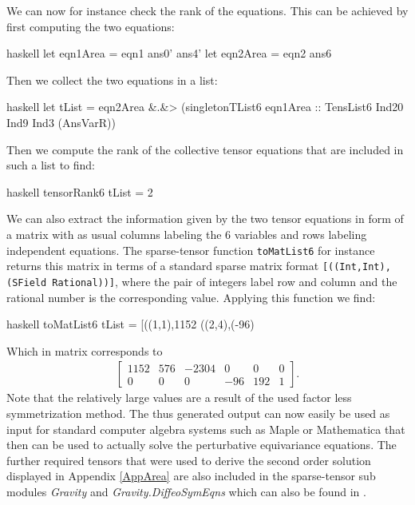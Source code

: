 \documentclass[a4paper,12pt, DIV=14, BCOR=5mm, twoside, headsepline, numbers=noenddot]{scrbook}
\begin{document}
We can now for instance check the rank of the equations. This can be achieved by first computing the two equations:

\begin{center}
\begin{cminted}{haskell}
let eqn1Area = eqn1 ans0' ans4' 
let eqn2Area = eqn2 ans6  
\end{cminted}
\end{center}
Then we collect the two equations in a list:
\begin{center}
\begin{cminted}{haskell}
let tList = eqn2Area &.&> (singletonTList6 eqn1Area ::
            TensList6 Ind20 Ind9 Ind3 (AnsVarR)) 
\end{cminted}
\end{center}
Then we compute the rank of the collective tensor equations that are included in such a list to find:
\begin{center}
\begin{cminted}{haskell}
tensorRank6 tList = 2 
\end{cminted}
\end{center}
We can also extract the information given by the two tensor equations in form of a matrix with as usual columns labeling the 6 variables and rows labeling independent equations. The sparse-tensor function \texttt{toMatList6} for instance returns this matrix in terms of a standard sparse matrix format \texttt{[((Int,Int),(SField Rational))]}, where the pair of integers label row and column and the rational number is the corresponding value. Applying this function we find:
\begin{center}
\begin{cminted}{haskell}
toMatList6 tList = [((1,1),1152 %
                   ((2,4),(-96) %
\end{cminted}
\end{center}
Which in matrix corresponds to 
\begin{align}
    \begin{bmatrix}
    1152 & 576 & -2304 & 0 & 0 & 0 \\
    0 & 0 & 0 & -96 & 192 & 1
    \end{bmatrix}.
\end{align}
Note that the relatively large values are a result of the used factor less symmetrization method. The thus generated output can now easily be used as input for standard computer algebra systems such as Maple or Mathematica that then can be used to actually solve the perturbative equivariance equations.
The further required tensors that were used to derive the second order solution displayed in Appendix \ref{AppArea}
are also included in the sparse-tensor sub modules \textit{Gravity} and \textit{Gravity.DiffeoSymEqns} which can also be found in \cite{sparse-tensor}. 
\end{document}
